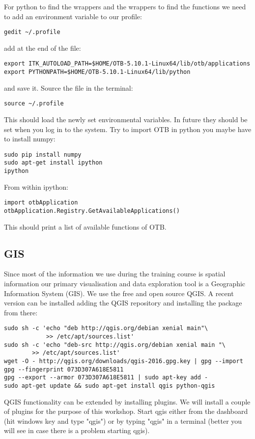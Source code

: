 \documentclass{article}
\begin{document}
For python to find the wrappers and 
the wrappers to find the functions we need to add an 
environment variable to our profile:
\begin{verbatim}
gedit ~/.profile
\end{verbatim}
add at the end of the file:
\begin{verbatim}
export ITK_AUTOLOAD_PATH=$HOME/OTB-5.10.1-Linux64/lib/otb/applications
export PYTHONPATH=$HOME/OTB-5.10.1-Linux64/lib/python
\end{verbatim}
and save it. Source the file in the terminal:
\begin{verbatim}
source ~/.profile
\end{verbatim}
This should load the newly set environmental variables. In future
they should be set when you log in to the system.
Try to import OTB in python you maybe have to install numpy:
\begin{verbatim}
sudo pip install numpy
sudo apt-get install ipython
ipython
\end{verbatim}
From within ipython:
\begin{verbatim}
import otbApplication
otbApplication.Registry.GetAvailableApplications()
\end{verbatim}
This should print a list of available functions of OTB. 

\subsection{GIS}

Since most of the information we use during the training course
is spatial information our primary visualisation and 
data exploration tool is a Geographic Information System (GIS).
We use the free and open source QGIS. A recent version
can be installed adding the QGIS repository and installing the
package from there:
\begin{verbatim}
sudo sh -c 'echo "deb http://qgis.org/debian xenial main"\
            >> /etc/apt/sources.list'  
sudo sh -c 'echo "deb-src http://qgis.org/debian xenial main "\
	    >> /etc/apt/sources.list'  
wget -O - http://qgis.org/downloads/qgis-2016.gpg.key | gpg --import
gpg --fingerprint 073D307A618E5811
gpg --export --armor 073D307A618E5811 | sudo apt-key add -
sudo apt-get update && sudo apt-get install qgis python-qgis
\end{verbatim}

QGIS functionality can be extended by installing plugins. We
will install a couple of plugins for the purpose of this
workshop. Start qgis either from the dashboard (hit windows key and
type "qgis") or by typing "qgis" in a terminal (better you will see
in case there is a problem starting qgis). 
\end{document}
